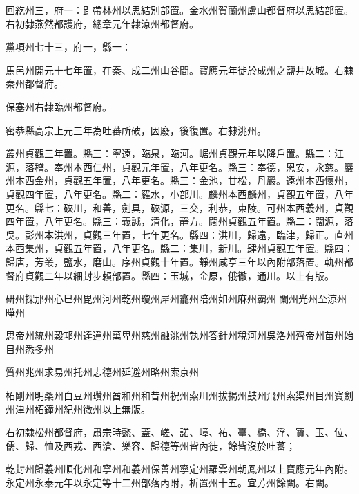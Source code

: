 \begin{pinyinscope}
 回紇州三，府一：𧾷帶林州以思結別部置。金水州賀蘭州盧山都督府以思結部置。右初隸燕然都護府，總章元年隸涼州都督府。



 黨項州七十三，府一，縣一：



 馬邑州開元十七年置，在秦、成二州山谷間。寶應元年徙於成州之鹽井故城。右隸秦州都督府。



 保塞州右隸臨州都督府。



 密恭縣高宗上元三年為吐蕃所破，因廢，後復置。右隸洮州。



 叢州貞觀三年置。縣三：寧遠，臨泉，臨河。崌州貞觀元年以降戶置。縣二：江源，落稽。奉州本西仁州，貞觀元年置，八年更名。縣三：奉德，恩安，永慈。巖州本西金州，貞觀五年置，八年更名。縣三：金池，甘松，丹巖。遠州本西懷州，貞觀四年置，八年更名。縣二：羅水，小部川。麟州本西麟州，貞觀五年置，八年更名。縣七：硤川，和善，劍具，硤源，三交，利恭，東陵。可州本西義州，貞觀四年置，八年更名。縣三：義誠，清化，靜方。闊州貞觀五年置。縣二：闊源，落吳。彭州本洪州，貞觀三年置，七年更名。縣四：洪川，歸遠，臨津，歸正。直州本西集州，貞觀五年置，八年更名。縣二：集川，新川。肆州貞觀五年置。縣四：歸唐，芳叢，鹽水，磨山。序州貞觀十年置。靜州咸亨三年以內附部落置。軌州都督府貞觀二年以細封步賴部置。縣四：玉城，金原，俄徹，通川。以上有版。



 研州探那州心巳州毘州河州乾州瓊州犀州龕州陪州如州麻州霸州闌州光州至涼州曄州



 思帝州統州穀邛州達違州萬卑州慈州融洮州執州答針州稅河州吳洛州齊帝州苗州始目州悉多州



 質州兆州求易州托州志德州延避州略州索京州



 柘剛州明桑州白豆州瓚州酋和州和昔州祝州索川州拔揭州鼓州飛州索渠州目州寶劍州津州柘鐘州紀州微州以上無版。



 右初隸松州都督府，肅宗時懿、蓋、嵯、諾、嶂、祐、臺、橋、浮、寶、玉、位、儒、歸、恤及西戎、西滄、樂容、歸德等州皆內徙，餘皆沒於吐蕃；



 乾封州歸義州順化州和寧州和義州保善州寧定州羅雲州朝鳳州以上寶應元年內附。永定州永泰元年以永定等十二州部落內附，析置州十五。宜芳州餘闕。右闕。




\end{pinyinscope}
